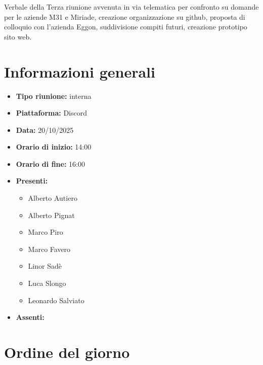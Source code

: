 \documentclass[a4paper,12pt]{article}
\begin{document}
\vspace{0.5cm}

\begin{center}
\begin{tcolorbox}[colback=secondaryblue!10,colframe=secondaryblue,width=0.9\textwidth,arc=3mm,boxrule=0.8pt,title={\bfseries Abstract}]
Verbale della Terza riunione avvenuta in via telematica per confronto su domande per le aziende M31 e Miriade, creazione organizzazione su github, proposta di colloquio con l'azienda Eggon, suddivisione compiti futuri, creazione prototipo sito web.
\end{tcolorbox}
\end{center}

\newpage

\tableofcontents
\newpage


\section{Informazioni generali}

\begin{itemize}
    \item \textbf{Tipo riunione:} interna
    \item \textbf{Piattaforma:} Discord
    \item \textbf{Data:} 20/10/2025
    \item \textbf{Orario di inizio:} 14:00
    \item \textbf{Orario di fine:} 16:00
    \item \textbf{Presenti:}
    \begin{itemize}[leftmargin=1.5em, itemsep=3pt, label={\rule[0.5ex]{0.4em}{0.4em}}]
        \item Alberto Autiero
        \item Alberto Pignat
        \item Marco Piro
        \item Marco Favero
        \item Linor Sadè
        \item Luca Slongo
        \item Leonardo Salviato
    \end{itemize}
    \item \textbf{Assenti:}

\end{itemize}

\section{Ordine del giorno}
\end{document}
